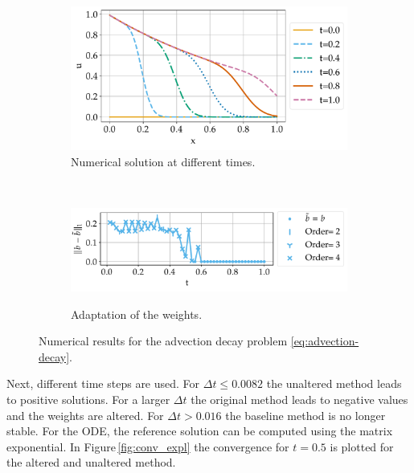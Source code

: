 \documentclass[a4paper]{article}
\numberwithin{equation}{section}
\theoremstyle{plain}
\theoremstyle{definition}
\numberwithin{theorem}{section}
\newcommand{\dt}{{\Delta t}}
\newcommand{\1}{\mathbbm{1}}
\begin{document}
\begin{figure}
\centering
\begin{subfigure}[t]{0.45\textwidth}
\centering
\includegraphics[width=1\textwidth]{plots/Advection_Decay.pdf}
\caption{Numerical solution at different times.}
\label{fig:sol_AdDe}
\end{subfigure}%
~
\begin{subfigure}[t]{0.45\textwidth}
\centering
\includegraphics[width=1\textwidth]{plots/b_Advection_Decay.pdf}\\
\caption{Adaptation of the weights.}
\label{fig:weights_AdDe}
\end{subfigure}
\caption{Numerical results for the advection decay problem \eqref{eq:advection-decay}.}
\end{figure}


Next, different time steps are used.
For $\dt \leq 0.0082$ the unaltered method leads to positive solutions. For a larger $\dt$ the original method leads to negative values and the weights are altered. For $\dt >0.016$ the baseline method is no longer stable.
For the ODE, the reference solution can be computed using the matrix exponential.
In Figure\,\ref{fig:conv_expl} the convergence for $t=0.5$ is plotted for the altered and unaltered method.
\end{document}
